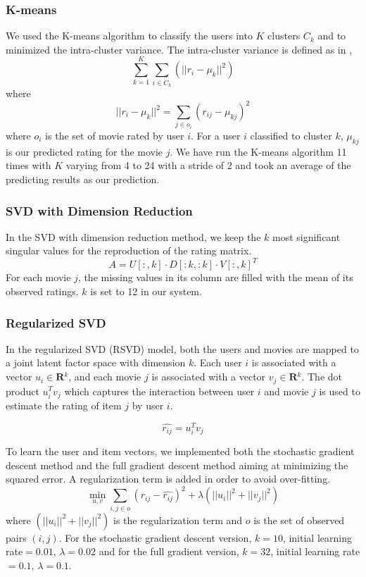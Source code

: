 \documentclass[10pt,conference,compsocconf]{IEEEtran}
\begin{document}
\subsubsection{K-means}
We used the K-means algorithm to classify the users into $K$ clusters $C_k$ and to minimized the intra-cluster variance. The intra-cluster variance is defined as in \cite{Paterek2007Improving}, $$   \sum_{k=1}^K \sum_{i \in C_k} (||r_{i}-\mu_k||^2)  $$ where $$  ||r_{i}-\mu_k||^2 = \sum_{j \in o_i}(r_{ij}-\mu_{kj})^2  $$ where $o_i$ is the set of movie rated by user $i$.
 For a user $i$ classified to cluster $k$, $\mu_{kj}$ is our predicted rating for the movie $j$. We have run the K-means algorithm 11 times with $K$ varying from 4 to 24 with a stride of 2 and took an average of the predicting results as our prediction.

\subsubsection{SVD with Dimension Reduction}
In the SVD with dimension reduction method, we keep the $k$ most significant singular values for the reproduction of the rating matrix.
\[A = U[:,k] \cdot D[:k,:k] \cdot V{[:,k]^T}\]
For each movie $j$, the missing values in its column are filled with the mean of its observed ratings. $k$ is set to 12 in our system.

\subsubsection{Regularized SVD}
In the regularized SVD (RSVD) model, both the users and movies are mapped to a joint latent factor space with dimension $k$. Each user $i$ is associated with a vector $u_{i} \in \textbf{R$^k$}$, and each movie $j$ is associated with a vector $v_{j} \in \textbf{R$^k$} $. The dot product $u_i^Tv_j$ which captures the interaction between user $i$ and movie $j$ is used to estimate the rating of item $j$ by user $i$.

$$ \hat{r_{ij}}=u_{i}^{T}v_{j} $$

To learn the user and item vectors, we implemented both the stochastic gradient descent method and the full gradient descent method aiming at minimizing the squared error. A regularization term is added in order to avoid over-fitting.
$$  \min \limits_{u, v} \sum_{i, j\in o} (r_{ij} - \hat{r_{ij}})^2 + \lambda (||u_i||^2 + ||v_j||^2)  $$
where $ (||u_i||^2 + ||v_j||^2)$ is the regularization term and $o$ is the set of observed pairs $(i, j)$. For the stochastic gradient descent version, $k=10$, initial learning rate$=0.01$, $\lambda=0.02$ and for the full gradient version, $k=32$, initial learning rate$=0.1$, $\lambda=0.1$.
\end{document}
